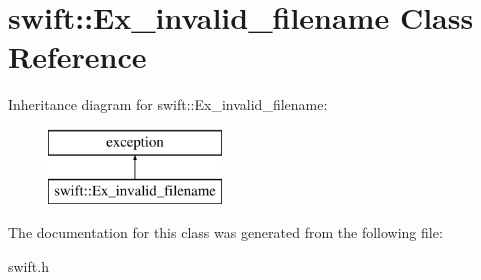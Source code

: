 \hypertarget{classswift_1_1_ex__invalid__filename}{\section{swift\-:\-:Ex\-\_\-invalid\-\_\-filename Class Reference}
\label{classswift_1_1_ex__invalid__filename}
}
Inheritance diagram for swift\-:\-:Ex\-\_\-invalid\-\_\-filename\-:\begin{figure}[H]
\begin{center}
\leavevmode
\includegraphics[height=2.000000cm]{classswift_1_1_ex__invalid__filename}
\end{center}
\end{figure}


The documentation for this class was generated from the following file\-:\begin{DoxyCompactItemize}
\item 
swift.\-h\end{DoxyCompactItemize}
